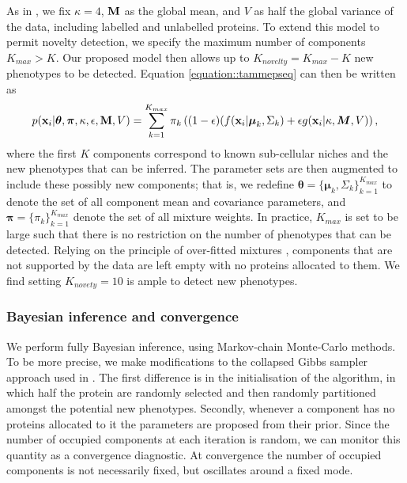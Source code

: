 \documentclass[12pt,english]{article}
\begin{document}
As in \cite{Crook:2018}, we fix $\kappa = 4$, ${\bf M}$ as the global mean, and $V$
as half the global variance of the data, including labelled and unlabelled proteins. To extend this model to permit novelty detection, we specify the maximum number of components $K_{max} > K$. Our proposed model then allows up to $K_{novelty} = K_{max} - K$ new phenotypes to be detected. Equation \ref{equation::tammepseq} can then be written as 
\begin{equation}\label{equation::tammepseq2}
\begin{split}
p({\bf x}_i| \boldsymbol{\theta}, \boldsymbol{\pi} , \kappa, \epsilon, {\bf M}, V) &=  \sum_{k=1}^{K_{max}}\pi_k\left((1-\epsilon)(f({\bf x}_i |\boldsymbol{\mu}_k, \Sigma_k) + \epsilon g({\bf x}_i|\kappa, \boldsymbol{M}, V)\right),\\
\end{split}
\end{equation}
where the first $K$ components correspond to known sub-cellular niches and the new phenotypes that can be inferred. The parameter sets are then augmented to include these possibly new components; that is, we redefine 
$\boldsymbol{\theta} = \{\boldsymbol{\mu}_k, \Sigma_k \}_{k = 1}^{K_{max}}$
to denote the set of all component mean and covariance parameters, and
$\boldsymbol{\pi} = \{\pi_k\}_{k = 1}^{K_{max}}$ denote the set of all mixture
weights. In practice, $K_{max}$ is set to be large such that there is no restriction on the number of phenotypes that can be detected. Relying on the principle of over-fitted mixtures \cite{Rousseau::2011}, components that are not supported by the data are left empty with no proteins allocated to them. We find setting $K_{novety} = 10$ is ample to detect new phenotypes.   
\subsubsection{Bayesian inference and convergence}
We perform fully Bayesian inference, using Markov-chain Monte-Carlo methods. To be more precise, we make modifications to the collapsed Gibbs sampler approach used in \cite{Crook:2018}. The first difference is in the initialisation of the algorithm, in which half the protein are randomly selected and then randomly partitioned amongst the potential new phenotypes. Secondly, whenever a component has no proteins allocated to it the parameters are proposed from their prior. Since the number of occupied components at each iteration is random, we can monitor this quantity as a convergence diagnostic. At convergence the number of occupied components is not necessarily fixed, but oscillates around a fixed mode.
\end{document}
